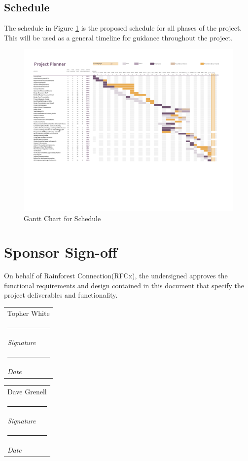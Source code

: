 \documentclass{article}
\makeatletter
\numberwithin{figure}{section}
\numberwithin{equation}{section}
\let\oldappendix\appendix %
\renewcommand\appendix{%
    \oldappendix
    \newcommand{\section@cntformat}{\appendixname~\thesection\quad}
}
\newcommand{\namesigdate}[2][5cm]{%
  \begin{tabular}{@{}p{#1}@{}}
    #2 \\[2\normalbaselineskip] \hrule \\[0pt]
    {\small \textit{Signature}} \\[2\normalbaselineskip] \hrule \\[0pt]
    {\small \textit{Date}}
  \end{tabular}
}
\makeatother
\begin{document}
{\begin{landscape}
\subsection{Schedule} \label{sect:schedule}
The schedule in Figure \ref{fig:gantt} is the proposed schedule for all phases of the project. This will be used as a general timeline for guidance throughout the project.

\begin{figure}[H]
  \centering
  \includegraphics[scale=0.85, trim=0cm 5cm 0cm 0cm, clip=true]{Schedule.pdf}
  \caption{Gantt Chart for Schedule}
  \label{fig:gantt}
\end{figure}
\end{landscape}

\newpage
\section{Sponsor Sign-off}
On behalf of Rainforest Connection(RFCx), the undersigned  approves the functional requirements and design contained in this document that specify the project deliverables and functionality.

\bigskip

\bigskip
\noindent \namesigdate{Topher White} \hfill \namesigdate{Dave Grenell}


\newpage
\vspace*{\fill}
\section*{}
\vspace*{\fill}
\newpage
\appendix
}
\end{document}
